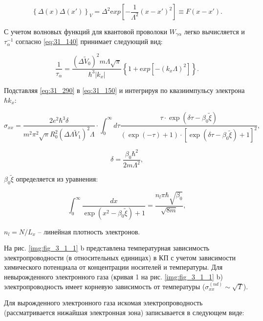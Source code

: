 \begin{equation} \label{eq:31_280}
\left\{\Delta (x)\Delta (x')\right\}_{V} =\Delta ^{2} {\mathrm exp}\left[-\frac{1}{\Lambda ^{2} } \left(x-x'\right)^{2} \right]\equiv F\left(x-x'\right).
\end{equation}

С учетом волновых функций для квантовой проволоки \cite{Constantinou1989} $W_{\gamma \alpha } $ легко вычисляется и $\tau _{\alpha }^{-1} $ согласно \eqref{eq:31_140} принимает следующий вид:

\begin{equation} \label{eq:31_290}
\frac{1}{\tau _{\alpha } } =\frac{(\Delta \tilde{V}_{0} )^{2} m\Lambda \sqrt{\pi } }{\hbar ^{3} \left|k_{x} \right|} \left\{{\mathrm 1}+{\mathrm exp}\left[{\mathrm -}\left(k_{x} \Lambda \right)^{2} \right]\right\}.
\end{equation}

Подставляя \eqref{eq:31_290} в \eqref{eq:31_150} и интегрируя по квазиимпульсу электрона $\hbar k_{x} $:

\begin{equation} \label{eq:31_300}
\sigma _{xx} =\frac{2e^{2} \hbar ^{3} \delta }{m^{2} \pi ^{2} \sqrt{\pi } R_{0}^{2} \left(\Delta \Lambda \tilde{V}_{1} \right)^{2} \Lambda } \cdot \int _{0}^{\infty }d\tau \frac{\tau \cdot {\exp}\left(\delta \tau -\beta _{0} \tilde{\xi }\right)}{\left(\exp(-\tau )+1\right)\cdot \left[{\exp}\left(\delta \tau -\beta _{0} \tilde{\xi }\right)+1\right]^{2} },
\end{equation}

$$\delta =\frac{\beta _{0} \hbar ^{2} }{2m\Lambda ^{2} },$$

\noindent $\beta _{0} \tilde{\xi }$ определяется из уравнения:

\[
\int _{0}^{\infty }\frac{dx}{\exp \left(x^{2} -\beta _{0} \tilde{\xi }\right)+1} =\frac{n_{l} \pi \hbar \sqrt{\beta _{0} } }{\sqrt{8m} },
\]

\noindent $n_{l} =N/L_{x} $ -- линейная плотность электронов.

На рис. \ref{img:fig_3_1_1} b представлена температурная зависимость электропроводности (в относительных единицах) в КП с учетом зависимости химического потенциала от концентрации носителей и температуры. Для невырожденного электронного газа (кривая 1 на рис. \ref{img:fig_3_1_1} b) электропроводность имеет корневую зависимость от температуры ($\sigma _{xx}^{(nd)} \sim \sqrt{T} $).

Для вырожденного электронного газа искомая электропроводность (рассматривается нижайшая электронная зона) записывается в следующем виде:


